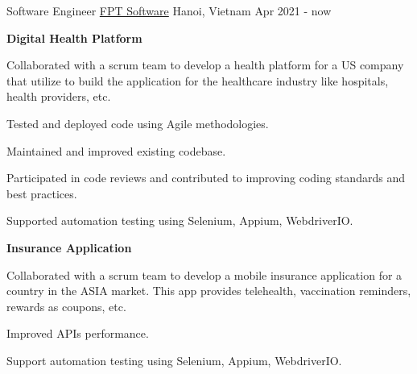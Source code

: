 

\begin{cventries}

  \cventry
  {Software Engineer} %
  {\underline{FPT Software}} %
  {Hanoi, Vietnam} %
  {Apr 2021 - now} %
  {
  	\begin{cvitems} %
  		\item[ ] {\textbf {Digital Health Platform}}
  		\item {Collaborated with a scrum team to develop a health platform for a US company that utilize to build the application for the healthcare industry like hospitals, health providers, etc.}
  		\item {Tested and deployed code using Agile methodologies.}
  		\item {Maintained and improved existing codebase.}
  		\item {Participated in code reviews and contributed to improving coding standards and best practices.}
  		\item {Supported automation testing using Selenium, Appium, WebdriverIO.}
  		\item[ ] {\textbf {Insurance Application}}
  		\item {Collaborated with a scrum team to develop a mobile insurance application for a country in the ASIA market. This app provides telehealth, vaccination reminders, rewards as coupons, etc.}
  		\item {Improved APIs performance.}
  		\item {Support automation testing using Selenium, Appium, WebdriverIO.}
  		\item[ ]

\end{cvitems}}
\end{cventries}
